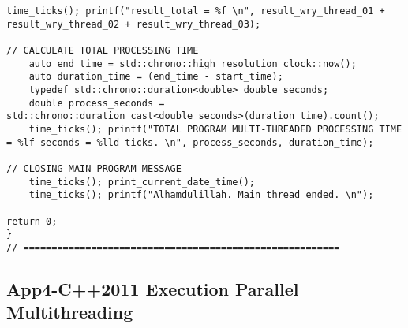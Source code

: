 \begin{lstlisting}[caption={App4-C++2011 Example Parallel Multithreading}, label=App4-C++2011 Example Parallel Multithreading]
	time_ticks(); printf("result_total = %f \n", result_wry_thread_01 + result_wry_thread_02 + result_wry_thread_03);

// CALCULATE TOTAL PROCESSING TIME
	auto end_time = std::chrono::high_resolution_clock::now();
	auto duration_time = (end_time - start_time);
	typedef std::chrono::duration<double> double_seconds;
	double process_seconds = std::chrono::duration_cast<double_seconds>(duration_time).count();
	time_ticks(); printf("TOTAL PROGRAM MULTI-THREADED PROCESSING TIME = %lf seconds = %lld ticks. \n", process_seconds, duration_time);

// CLOSING MAIN PROGRAM MESSAGE
	time_ticks(); print_current_date_time();
	time_ticks(); printf("Alhamdulillah. Main thread ended. \n");

return 0;
}
// ========================================================
\end{lstlisting}

\pagebreak
\subsection{App4-C++2011 Execution Parallel Multithreading}


